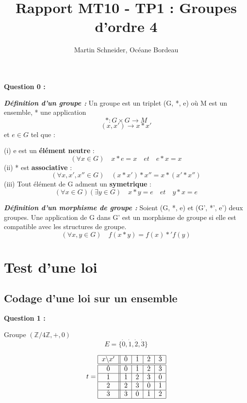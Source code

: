 \documentclass[titlepage]{article}
\title{Rapport MT10 - TP1 : Groupes d’ordre 4}
\author{Martin Schneider, Océane Bordeau}
\begin{document}
    \maketitle
    \tableofcontents
    \pagebreak
    \textbf{Question 0 :}

    \textbf{\emph{Définition d'un groupe :}} Un groupe est un triplet (G, *, e) où M est un ensemble, * une application
    \[*:G \times G \longrightarrow M\]
    \[(x, x') \longrightarrow x*x'\]
    et $e \in G$ tel que : 

    (i) e est un \textbf{élément neutre} : \[(\forall x \in G) \quad x*e=x \quad et \quad e*x=x\]
    (ii) * est \textbf{associative} : \[(\forall x, x', x'' \in G) \quad (x*x')*x''=x*(x'*x'')\]
    (iii) Tout élément de G adment un \textbf{symetrique} : \[(\forall x \in G)(\exists y \in G) \quad x*y=e \quad et \quad y*x=e\]

    \textbf{\emph{Définition d'un morphisme de groupe :}} Soient (G, *, e) et (G', *', e') deux groupes. 
    Une application de G dans G' est un morphisme de groupe si elle est compatible avec les structures de groupe.
    \[(\forall x, y \in G) \quad f(x*y)=f(x)*'f(y)\]

    \section{Test d'une loi}
        \subsection{Codage d'une loi sur un ensemble}
        \textbf{Question 1 :}

        Groupe $(\mathbb{Z}/4\mathbb{Z}, +, 0)$
        \[E = \{\dot{0}, \dot{1}, \dot{2}, \dot{3}\}\]

        \[t=\begin{tabular}{| c || c | c | c | c |}
            \hline
            $x$\textbackslash $x'$ & $\dot{0}$ & $\dot{1}$ & $\dot{2}$ & $\dot{3}$ \\ \hline \hline
            $\dot{0}$ & $\dot{0}$ & $\dot{1}$ & $\dot{2}$ & $\dot{3}$ \\ \hline
            $\dot{1}$ & $\dot{1}$ & $\dot{2}$ & $\dot{3}$ & $\dot{0}$ \\ \hline
            $\dot{2}$ & $\dot{2}$ & $\dot{3}$ & $\dot{0}$ & $\dot{1}$ \\ \hline
            $\dot{3}$ & $\dot{3}$ & $\dot{0}$ & $\dot{1}$ & $\dot{2}$ \\
            \hline
        \end{tabular}\]
\end{document}
